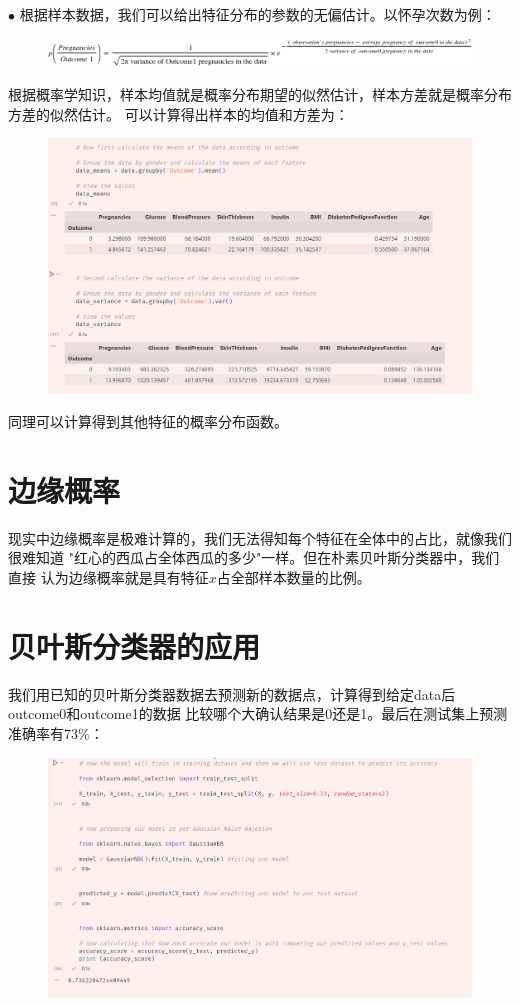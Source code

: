 \documentclass{article}
\begin{document}
$\bullet$ 根据样本数据，我们可以给出特征分布的参数的无偏估计。以怀孕次数为例：
\begin{figure}[H]
	\centering
	\includegraphics[width=\linewidth]{bay1.png}
\end{figure}

根据概率学知识，样本均值就是概率分布期望的似然估计，样本方差就是概率分布方差的似然估计。
可以计算得出样本的均值和方差为：
\begin{figure}[H]
	\centering
	\includegraphics[width=\linewidth]{4.png}
\end{figure}

同理可以计算得到其他特征的概率分布函数。

\section{边缘概率}
现实中边缘概率是极难计算的，我们无法得知每个特征在全体中的占比，就像我们很难知道
"红心的西瓜占全体西瓜的多少"一样。但在朴素贝叶斯分类器中，我们直接
认为边缘概率就是具有特征$x$占全部样本数量的比例。
\section{贝叶斯分类器的应用}
我们用已知的贝叶斯分类器数据去预测新的数据点，计算得到给定data后outcome0和outcome1的数据
比较哪个大确认结果是0还是1。最后在测试集上预测准确率有73\%：
\begin{figure}[H]
	\centering
	\includegraphics[width=\linewidth]{5.png}
\end{figure}
\end{document}
